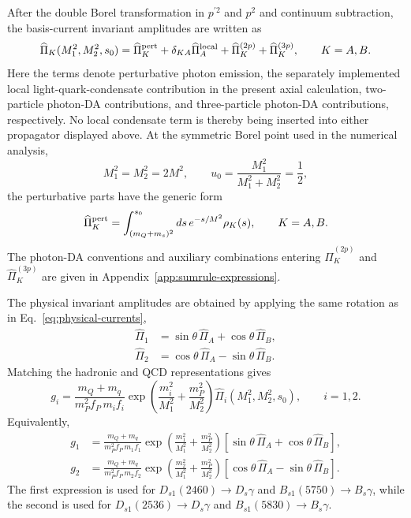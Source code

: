 \documentclass[aps,prd,preprint,nofootinbib,superscriptaddress]{revtex4-2}
\newcommand{\Ds}{D_s}
\newcommand{\Dsone}{D_{s1}}
\newcommand{\Bs}{B_s}
\newcommand{\Bsone}{B_{s1}}
\begin{document}
After the double Borel transformation in \(p^{\prime2}\) and \(p^2\) and continuum
subtraction, the basis-current invariant amplitudes are written as
\begin{equation}
  \widehat\Pi_K(M_1^2,M_2^2,s_0)
  =
  \widehat\Pi_K^{\rm pert}
  +\delta_{KA}\widehat\Pi_A^{\rm local}
  +\widehat\Pi_K^{(2p)}
  +\widehat\Pi_K^{(3p)},
  \qquad K=A,B .
  \label{eq:pi-decomp}
\end{equation}
Here the terms denote perturbative photon emission, the separately implemented
local light-quark-condensate contribution in the present axial calculation,
two-particle photon-DA contributions, and three-particle photon-DA
contributions, respectively.  No local condensate term is thereby being
inserted into either propagator displayed above.  At the symmetric Borel point
used in the numerical analysis,
\begin{equation}
  M_1^2=M_2^2=2M^2,
  \qquad
  u_0=\frac{M_1^2}{M_1^2+M_2^2}=\frac12 ,
  \label{eq:borel-defs}
\end{equation}
the perturbative parts have the generic form
\begin{equation}
  \widehat\Pi_K^{\rm pert}
  =
  \int_{(m_Q+m_s)^2}^{s_0}ds\,e^{-s/M^2}\rho_K(s),
  \qquad K=A,B .
  \label{eq:pert-part}
\end{equation}
The photon-DA conventions and auxiliary combinations entering
\(\widehat\Pi_K^{(2p)}\) and \(\widehat\Pi_K^{(3p)}\) are given in
Appendix~\ref{app:sumrule-expressions}.

The physical invariant amplitudes are obtained by applying the same rotation
as in Eq.~\eqref{eq:physical-currents},
\begin{align}
  \widehat\Pi_1
  &=
  \sin\theta\,\widehat\Pi_A
  +\cos\theta\,\widehat\Pi_B ,
  \label{eq:pi1-rotation}\\
  \widehat\Pi_2
  &=
  \cos\theta\,\widehat\Pi_A
  -\sin\theta\,\widehat\Pi_B .
  \label{eq:pi2-rotation}
\end{align}
Matching the hadronic and QCD representations gives
\begin{equation}
  g_i =
  \frac{m_Q+m_q}{m_P^2 f_P\,m_i f_i}
  \exp\left(
  \frac{m_i^2}{M_1^2}
  +\frac{m_P^2}{M_2^2}
  \right)
  \widehat\Pi_i(M_1^2,M_2^2,s_0),
  \qquad i=1,2 .
  \label{eq:general-sum-rule}
\end{equation}
Equivalently,
\begin{align}
  g_1 &=
  \frac{m_Q+m_q}{m_P^2 f_P\,m_1 f_1}
  \exp\left(
  \frac{m_1^2}{M_1^2}
  +\frac{m_P^2}{M_2^2}
  \right)
  \left[
  \sin\theta\,\widehat\Pi_A
  +\cos\theta\,\widehat\Pi_B
  \right],
  \label{eq:g1-sum-rule}\\
  g_2 &=
  \frac{m_Q+m_q}{m_P^2 f_P\,m_2 f_2}
  \exp\left(
  \frac{m_2^2}{M_1^2}
  +\frac{m_P^2}{M_2^2}
  \right)
  \left[
  \cos\theta\,\widehat\Pi_A
  -\sin\theta\,\widehat\Pi_B
  \right].
  \label{eq:g2-sum-rule}
\end{align}
The first expression is used for
\(\Dsone(2460)\to\Ds\gamma\) and
\(\Bsone(5750)\to\Bs\gamma\), while the second is used for
\(\Dsone(2536)\to\Ds\gamma\) and
\(\Bsone(5830)\to\Bs\gamma\).
\end{document}
